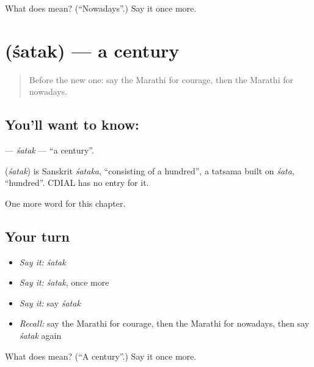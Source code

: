 \begin{tcolorbox}[breakable,colback=teal!4,colframe=teal!35!black,title={Before you move on}]
What does  mean? (\textquotedblleft{}Nowadays\textquotedblright{}.) Say it once more.
\end{tcolorbox}
\section[\texorpdfstring{\mr{शतक} (śatak)}{शतक (śatak)}]{ (śatak) — a century}

\label{lesson:MR-C258-satak}



\begin{quote}
Before the new one: say the Marathi for courage, then the Marathi for nowadays.
\end{quote}

\subsection*{You'll want to know: }
\textbf{} — \emph{śatak} — \textquotedblleft{}a century\textquotedblright{}.

\begin{cousinweb}
\textbf{} (\emph{śatak}) is Sanskrit \emph{śataka}, \textquotedblleft{}consisting of a hundred\textquotedblright{}, a tatsama built on \emph{śata}, \textquotedblleft{}hundred\textquotedblright{}. CDIAL has no entry for it.
\end{cousinweb}

\begin{grammarlens}[title={What you've built}]
One more word for this chapter.
\end{grammarlens}

\subsection*{Your turn}
\begin{itemize}
\raggedright
  \item \emph{Say it:} \emph{śatak}
  \item \emph{Say it:} \emph{śatak}, once more
  \item \emph{Say it:} say \emph{śatak}
  \item \emph{Recall:} say the Marathi for courage, then the Marathi for nowadays, then say \emph{śatak} again
\end{itemize}

\begin{tcolorbox}[breakable,colback=teal!4,colframe=teal!35!black,title={Before you move on}]
What does  mean? (\textquotedblleft{}A century\textquotedblright{}.) Say it once more.
\end{tcolorbox}
